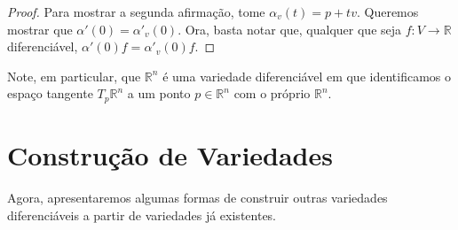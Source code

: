 \begin{lemma}
\begin{proof}
		Para mostrar a segunda afirmação, tome $\alpha_{v}(t)=p+tv$. Queremos mostrar que $\alpha'(0)=\alpha'_{v}(0)$. Ora, basta notar que, qualquer que seja $f:V\to \mathbb{R}$ diferenciável, $\alpha'(0)f=\alpha'_{v}(0)f$.
	\end{proof}
\end{lemma}
Note, em particular, que $\mathbb{R}^{n}$ é uma variedade diferenciável em que identificamos o espaço tangente $T_{p}\mathbb{R}^{n}$ a um ponto $p \in \mathbb{R}^{n}$ com o próprio $\mathbb{R}^{n}$.

\iffalse
	\section{Construção de Variedades}
	\label{sec:construcao-variedades}
	Agora, apresentaremos algumas formas de construir outras variedades diferenciáveis a partir de variedades já existentes.
